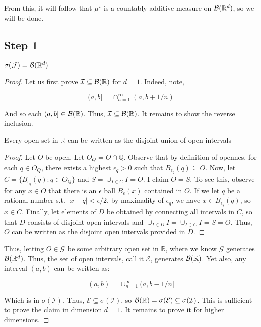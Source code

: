 From this, it will follow that $\mu^\star$ is a countably additive measure on $\mathcal B(\mathbb R^d)$, so 
we will be done. 

\subsection{Step 1}

\begin{theorem} 
   $\sigma(\mathcal J) = \mathcal B(\mathbb R^d)$
\end{theorem}
\begin{proof}
   Let us first prove $\mathcal I \subseteq \mathcal B(\mathbb R)$ for $d=1$. Indeed, note, 

   \[ (a,b] = \cap_{n=1}^\infty (a, b+1/n) \]

   And so each $(a,b] \in \mathcal B(\mathbb R)$. Thus, $\mathcal I \subseteq \mathcal B(\mathbb R)$. It remains to show the reverse inclusion. 

   \begin{Proposition}
      Every open set in $\mathbb R$ can be written as the disjoint union of open intervals
   \end{Proposition}

   \begin{proof}
      Let $O$ be open. Let $O_Q = O \cap \mathbb Q$. Observe that by definition of opennes, for each 
      $q \in O_Q$, there exists a highest $\epsilon_q > 0$ such that $B_{\epsilon_q}(q) \subseteq O$. Now, let 
      $C = \{B_{\epsilon_q}(q) : q \in O_Q\}$ and $S = \cup_{I \in C}I = O$. I claim $O = S$. To see this, observe 
      for any $x \in O$ that there is an $\epsilon$ ball $B_\epsilon(x)$ contained in $O$. 
      If we let $q$ be a rational number s.t. $|x - q| < \epsilon/2$, by maximality of 
      $\epsilon_q$, we have $x \in B_{\epsilon_q}(q)$, so $x \in C$. Finally, let elements of $D$ be obtained by connecting 
      all intervals in $C$, so that $D$ consists of disjoint open intervals and $\cup_{I \in D}I = \cup_{I \in C}I = S = O$. 
      Thus, $O$ can be written as the disjoint open intervals provided in $D$.
   \end{proof}

   Thus, letting $O \in \mathcal G$ be some arbitrary open set in $\mathbb R$, where we know 
   $\mathcal G$ generates $\mathcal B(\mathbb R^d)$. Thus, the set of open intervals, call it $\mathcal E$, generates 
   $\mathcal B(\mathbb R)$. Yet also, any interval $(a,b)$ can be written as:

   \[ (a,b) = \cup_{n = 1}^\infty (a,b - 1/n] \]

   Which is in $\sigma(\mathcal I)$. Thus, $\mathcal E \subseteq \sigma(\mathcal I)$, so 
   $\mathcal B(\mathbb R) = \sigma(\mathcal E) \subseteq \sigma(\mathcal I)$. This is sufficient to prove the claim 
   in dimension $d = 1$. It remains to prove it for higher dimensions. 


\end{proof}
